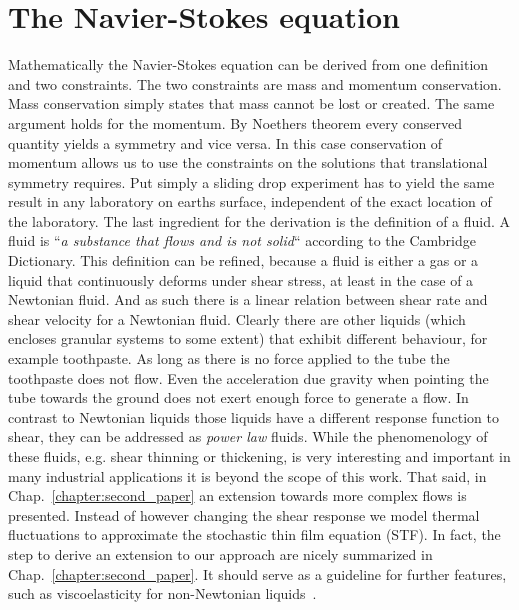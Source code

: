 \section{The Navier-Stokes equation}
\label{sec:navier_stokes_sec}
Mathematically the Navier-Stokes equation can be derived from one definition and two constraints.
The two constraints are mass and momentum conservation.
Mass conservation simply states that mass cannot be lost or created.
The same argument holds for the momentum.
By Noethers theorem every conserved quantity yields a symmetry and vice versa.
In this case conservation of momentum allows us to use the constraints on the solutions that translational symmetry requires.
Put simply a sliding drop experiment has to yield the same result in any laboratory on earths surface, independent of the exact location of the laboratory.
The last ingredient for the derivation is the definition of a fluid.
A fluid is ``\textit{a substance that flows and is not solid}`` according to the Cambridge Dictionary.
This definition can be refined, because a fluid is either a gas or a liquid that continuously deforms under shear stress, at least in the case of a Newtonian fluid.
And as such there is a linear relation between shear rate and shear velocity for a Newtonian fluid.
Clearly there are other liquids (which encloses granular systems to some extent) that exhibit different behaviour, for example toothpaste.
As long as there is no force applied to the tube the toothpaste does not flow.
Even the acceleration due gravity when pointing the tube towards the ground does not exert enough force to generate a flow.
In contrast to Newtonian liquids those liquids have a different response function to shear, they can be addressed as \textit{power law} fluids.
While the phenomenology of these fluids, e.g. shear thinning or thickening, is very interesting and important in many industrial applications it is beyond the scope of this work. 
That said, in Chap.~\ref{chapter:second_paper} an extension towards more complex flows is presented. 
Instead of however changing the shear response we model thermal fluctuations to approximate the stochastic thin film equation (STF).
In fact, the step to derive an extension to our approach are nicely summarized in Chap.~\ref{chapter:second_paper}. 
It should serve as a guideline for further features, such as viscoelasticity for non-Newtonian liquids~\cite{bouchutNewModelShallow2013}. 

